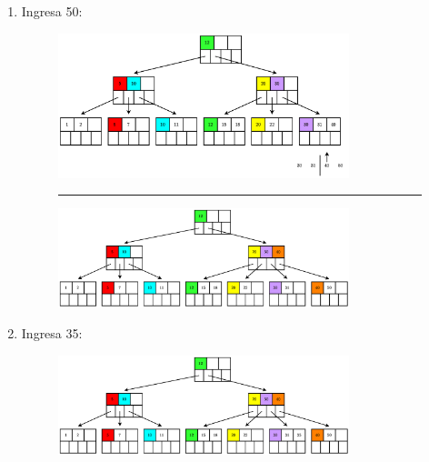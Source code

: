 \documentclass{templateNote}
\begin{document}
\begin{itemize}
\begin{enumerate}
\begin{enumerate}
\begin{enumerate}
                \newpage
                \item Ingresa 50:
                \begin{figure}[H]
                    \centering
                    \includegraphics[width=0.8\textwidth]{diagram/P3-1-15-1.png}
                    \rule{\textwidth}{1pt}
                    \includegraphics[width=0.8\textwidth]{diagram/P3-1-15-2.png}
                \end{figure}

                \item Ingresa 35:
                \begin{figure}[H]
                    \centering
                    \includegraphics[width=0.8\textwidth]{diagram/P3-1-16.png}
                \end{figure}


\end{enumerate}
\end{enumerate}
\end{enumerate}
\end{itemize}
\end{document}
